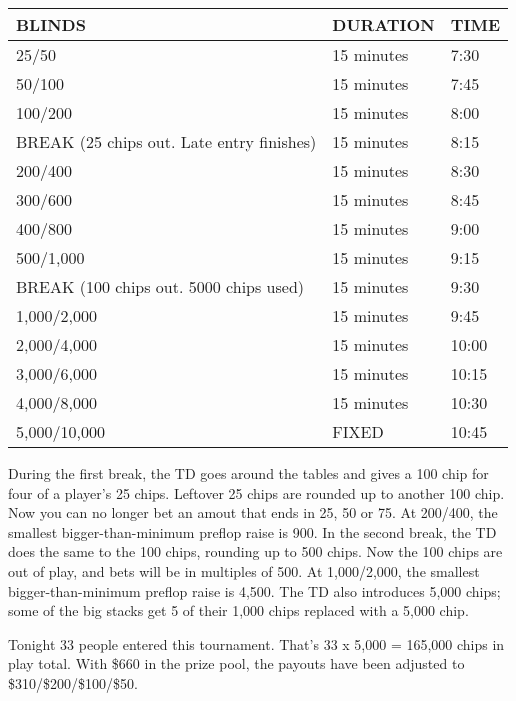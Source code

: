 \begin{tabular}{|l|l|l|} \hline
BLINDS  &  DURATION   & TIME \\ \hline
25/50   &  15 minutes & 7:30 \\ \hline
50/100  &  15 minutes & 7:45 \\ \hline
100/200 &  15 minutes & 8:00 \\ \hline
BREAK (25 chips out. Late entry finishes)  &  15 minutes & 8:15 \\ \hline
200/400 &  15 minutes & 8:30 \\ \hline
300/600 &  15 minutes & 8:45 \\ \hline
400/800 &  15 minutes & 9:00 \\ \hline
500/1,000 & 15 minutes & 9:15 \\ \hline
BREAK (100 chips out. 5000 chips used)   &  15 minutes  & 9:30 \\ \hline
1,000/2,000 & 15 minutes & 9:45 \\ \hline
2,000/4,000 & 15 minutes & 10:00 \\ \hline
3,000/6,000 & 15 minutes & 10:15 \\ \hline
4,000/8,000 & 15 minutes & 10:30 \\ \hline
5,000/10,000 & FIXED & 10:45 \\ \hline
\end{tabular}

\newpage
During the first break, the TD goes around the tables and gives a 100
chip for four of a player's 25 chips. Leftover 25 chips are rounded up
to another 100 chip. Now you can no longer bet an amout that ends in
25, 50 or 75. At 200/400, the smallest bigger-than-minimum preflop
raise is 900. In the second break, the TD does the same to the 100
chips, rounding up to 500 chips. Now the 100 chips are out of play,
and bets will be in multiples of 500. At 1,000/2,000, the smallest
bigger-than-minimum preflop raise is 4,500. The TD also introduces
5,000 chips; some of the big stacks get 5 of their 1,000 chips
replaced with a 5,000 chip.

Tonight 33 people entered this tournament. That's 33 x 5,000 = 165,000
chips in play total.
With \$660 in the prize pool, the payouts have been
adjusted to \$310/\$200/\$100/\$50.

